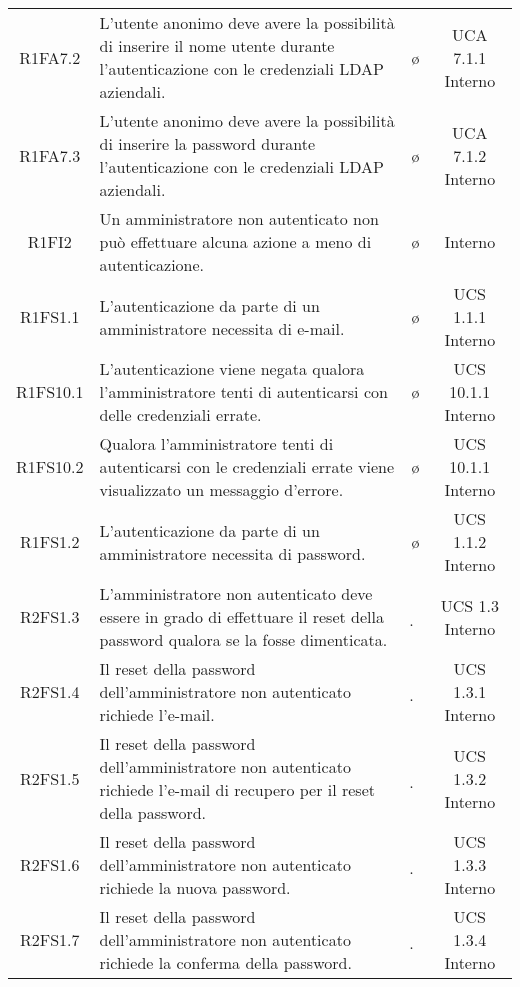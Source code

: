 {\begin{longtable}{ c C{6.5cm} c c}
R1FA7.2 & L'utente anonimo deve avere la possibilità di inserire il nome utente durante l'autenticazione con le credenziali LDAP aziendali. & \o & UCA 7.1.1 Interno \\

R1FA7.3 & L'utente anonimo deve avere la possibilità di inserire la password durante l'autenticazione con le credenziali LDAP aziendali. & \o & UCA 7.1.2 Interno \\

R1FI2 & Un amministratore non autenticato non può effettuare alcuna azione a meno di autenticazione. & \o & Interno \\

R1FS1.1 & L’autenticazione da parte di un amministratore necessita di e-mail. & \o & UCS 1.1.1 Interno\\

R1FS10.1 & L’autenticazione viene negata qualora l'amministratore tenti di autenticarsi con delle credenziali errate. & \o & UCS 10.1.1 Interno \\

R1FS10.2 & Qualora l'amministratore tenti di autenticarsi con le credenziali errate viene visualizzato un messaggio d’errore. & \o & UCS 10.1.1 Interno \\

R1FS1.2 & L’autenticazione da parte di un amministratore necessita di password. & \o & UCS 1.1.2 Interno\\

R2FS1.3 & L'amministratore non autenticato deve essere in grado di effettuare il reset della password qualora se la fosse dimenticata. & \d & UCS 1.3 Interno\\

R2FS1.4 & Il reset della password dell'amministratore non autenticato richiede l'e-mail. & \d & UCS 1.3.1 Interno \\

R2FS1.5 & Il reset della password dell'amministratore non autenticato richiede l'e-mail di recupero per il reset della password. & \d & UCS 1.3.2 Interno \\

R2FS1.6 & Il reset della password dell'amministratore non autenticato richiede la nuova password. & \d & UCS 1.3.3 Interno \\

R2FS1.7 & Il reset della password dell'amministratore non autenticato richiede la conferma della password. & \d & UCS 1.3.4 Interno \\


\end{longtable}}
